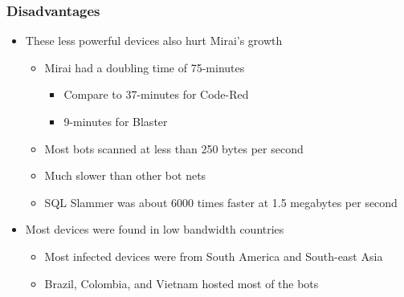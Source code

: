 \documentclass{beamer}
\begin{document}
\begin{frame}
	\frametitle{Disadvantages}
	\begin{itemize}
		\item<+-> These less powerful devices also hurt Mirai's growth
		\begin{itemize}
			\item<+-> Mirai had a doubling time of 75-minutes
			\begin{itemize}
				\item<+-> Compare to 37-minutes for Code-Red
				\item<+-> 9-minutes for Blaster
			\end{itemize}
			\item<+-> Most bots scanned at less than 250 bytes per second
			\item<+-> Much slower than other bot nets
			\item<+-> SQL Slammer was about 6000 times faster at 1.5 megabytes per second
		\end{itemize}
		\item<+-> Most devices were found in low bandwidth countries
		\begin{itemize}
			\item<+-> Most infected devices were from South America and South-east Asia
			\item<+-> Brazil, Colombia, and Vietnam hosted most of the bots
		\end{itemize}
	\end{itemize}
\end{frame}
\end{document}
